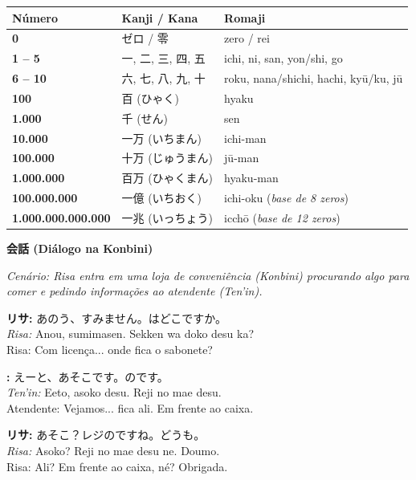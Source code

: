 \documentclass[12pt,a4paper]{article}
\begin{document}
\noindent
\small
\begin{tabularx}{\textwidth}{>{\bfseries\color{jpnavy}}l l X}
\toprule
Número & Kanji / Kana & Romaji \\
\midrule
0 & ゼロ / 零 & zero / rei \\
1 -- 5 & 一, 二, 三, 四, 五 & ichi, ni, san, yon/shi, go \\
6 -- 10 & 六, 七, 八, 九, 十 & roku, nana/shichi, hachi, kyū/ku, jū \\
\midrule
100 & 百 (ひゃく) & hyaku \\
1.000 & 千 (せん) & sen \\
10.000 & 一万 (いちまん) & ichi-man \\
100.000 & 十万 (じゅうまん) & jū-man \\
1.000.000 & 百万 (ひゃくまん) & hyaku-man \\
100.000.000 & 一億 (いちおく) & ichi-oku (\textit{base de 8 zeros}) \\
1.000.000.000.000 & 一兆 (いっちょう) & icchō (\textit{base de 12 zeros}) \\
\bottomrule
\end{tabularx}

\newpage

\begin{center}
    {\LARGE\bfseries 会話 (Diálogo na Konbini)}
\end{center}

\textit{Cenário: Risa entra em uma loja de conveniência (Konbini) procurando algo para comer e pedindo informações ao atendente (Ten'in).}

\vspace{0.8em}

\textbf{リサ:} あのう、すみません。はどこですか。\\
\textit{Risa:} Anou, sumimasen. Sekken wa doko desu ka?\\
Risa: Com licença... onde fica o sabonete?

\vspace{0.5em}

\textbf{:} えーと、あそこです。のです。\\
\textit{Ten'in:} Eeto, asoko desu. Reji no mae desu.\\
Atendente: Vejamos... fica ali. Em frente ao caixa.

\vspace{0.5em}

\textbf{リサ:} あそこ？レジのですね。どうも。\\
\textit{Risa:} Asoko? Reji no mae desu ne. Doumo.\\
Risa: Ali? Em frente ao caixa, né? Obrigada.
\end{document}
